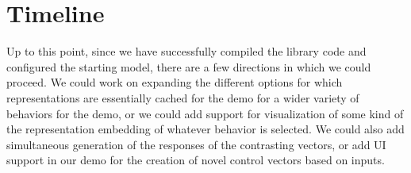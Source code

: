 \documentclass[11pt,a4paper]{article}
\begin{document}
\section{Timeline}
Up to this point, since we have successfully compiled the library code and configured the starting model, there are a few directions in which we could proceed. We could work on expanding the different options for which representations are essentially cached for the demo for a wider variety of behaviors for the demo, or we could add support for visualization of some kind of the representation embedding of whatever behavior is selected. We could also add simultaneous generation of the responses of the contrasting vectors, or add UI support in our demo for the creation of novel control vectors based on inputs.



\end{document}

